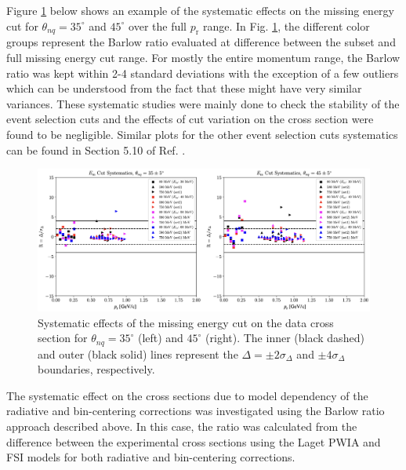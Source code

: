 \documentclass[aps, prl]{revtex4-2}  %
\begin{document}
\indent Figure \ref{fig:fig13} below shows an example of the systematic effects on the missing energy cut for $\theta_{nq}=35^{\circ}$ and $45^{\circ}$ over the full $p_{\mathrm{r}}$ range.
In Fig. \ref{fig:fig13}, the different color groups represent the Barlow ratio evaluated at difference between the subset and full missing energy cut range. For mostly the entire momentum range,
the Barlow ratio was kept within 2-4 standard deviations with the exception of a few outliers which can be understood from the fact that these might have very similar variances. These systematic
studies were mainly done to check the stability of the event selection cuts and the effects of cut variation on the cross section were found to be negligible. Similar plots for the other event selection
cuts systematics can be found in Section 5.10 of Ref. \cite{cyero_phdthesis}. 
\clearpage
\begin{figure}[!ht]
\includegraphics[scale=0.4]{plots/Em_syst.png}
\caption{Systematic effects of the missing energy cut on the data cross section for $\theta_{nq}=35^{\circ}$ (left) and $45^{\circ}$ (right). The inner (black dashed) and outer (black solid)
  lines represent the $\Delta=\pm2\sigma_{\Delta}$ and $\pm4\sigma_{\Delta}$ boundaries, respectively.}
\label{fig:fig13}
\end{figure}
\indent The systematic effect on the cross sections due to model dependency of the radiative and bin-centering corrections was investigated using the Barlow ratio approach described above.
In this case, the ratio was calculated from the difference between the experimental cross sections using the Laget PWIA and FSI models for both radiative and bin-centering corrections.
\end{document}

